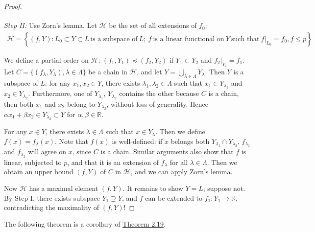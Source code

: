 \documentclass{article}
\begin{document}
\begin{proof}
\paragraph{} \textit{Step II:} Use Zorn's lemma. Let $\mathscr{H}$ be the set of all extensions of $f_0$:
\begin{align*}
	\mathscr{H}=\left\{(f,Y): L_0\subset Y\subset L\ \text{is a subspace of}\ L;\ f\ \text{is a linear functional on}\ Y\ \text{such that}\ f|_{L_0}=f_0, f\leq p\right\}
\end{align*}

We define a partial order on $\mathscr{H}$: $(f_1,Y_1)\preceq (f_2,Y_2)$ if $Y_1\subset Y_2$ and $f_2|_{Y_1}=f_1$. Let $C=\{(f_\lambda,Y_\lambda),\lambda\in\Lambda\}$ be a chain in $\mathscr{H}$, and let $Y=\bigcup_{\lambda\in\Lambda}Y_\lambda$. Then $Y$ is a subspace of $L$: for any $x_1,x_2\in Y$, there exists $\lambda_1,\lambda_2\in\Lambda$ such that $x_1\in Y_{\lambda_1}$ and $x_2\in Y_{\lambda_2}$. Furthermore, one of $Y_{\lambda_1}$, $Y_{\lambda_2}$ contains the other because $C$ is a chain, then both $x_1$ and $x_2$ belong to $Y_{\lambda_2}$, without loss of generality. Hence $\alpha x_1 + \beta x_2\in Y_{\lambda_2}\subset Y$ for $\alpha,\beta\in\mathbb{R}$.

For any $x\in Y$, there exists $\lambda\in\Lambda$ such that $x\in Y_\lambda$. Then we define $f(x)=f_\lambda(x)$. Note that $f(x)$ is well-defined: if $x$ belongs both $Y_{\lambda_1}\cap Y_{\lambda_2}$, $f_{\lambda_1}$ and $f_{\lambda_2}$ will agree on $x$, since $C$ is a chain. Similar arguments also show that $f$ is linear, subjected to $p$, and that it is an extension of $f_\lambda$ for all $\lambda\in\Lambda$. Then we obtain an upper bound $(f,Y)$ of $C$ in $\mathscr{H}$, and we can apply Zorn's lemma.

Now $\mathscr{H}$ has a maximal element $(f,Y)$. It remains to show $Y=L$; suppose not. By Step I, there exists subspace $Y_1\supsetneq Y$, and $f$ can be extended to $f_1:Y_1\to\mathbb{R}$, contradicting the maximality of $(f,Y)$!
\end{proof}

The following theorem is a corollary of \hyperref[thm:2.19]{Theorem 2.19}.
\end{document}
